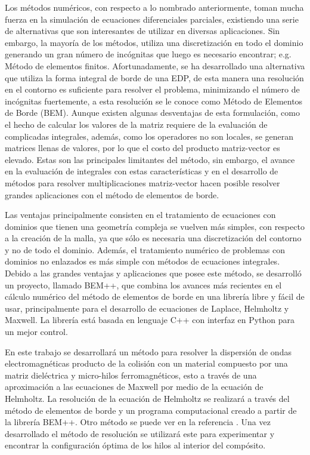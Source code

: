 \documentclass[12pt,letterpaper]{article}
\numberwithin{equation}{section}
\begin{document}
Los métodos numéricos, con respecto a lo nombrado anteriormente, toman mucha fuerza en la simulación de ecuaciones diferenciales parciales, existiendo una serie de alternativas que son interesantes de utilizar en diversas aplicaciones. Sin embargo, la mayoría de los métodos, utiliza una discretización en todo el dominio generando un gran número de incógnitas que
luego es necesario encontrar; e.g. Método de elementos finitos. Afortunadamente, se ha desarrollado una alternativa que utiliza la forma integral de borde de una EDP, de esta manera una resolución en el contorno es suficiente para resolver el problema, minimizando el número de incógnitas fuertemente, a esta resolución se le conoce como Método de Elementos de Borde
(BEM). Aunque existen algunas desventajas de esta formulación, como el hecho de calcular los valores de la matriz requiere de la evaluación de complicadas integrales, además, como los operadores no son locales, se generan matrices llenas de valores, por lo que el costo del producto matriz-vector es elevado. Estas son las principales limitantes del método, sin embargo, el avance en la evaluación de integrales con estas características y en el desarrollo de métodos para resolver multiplicaciones matriz-vector hacen posible resolver grandes aplicaciones con el método de elementos de borde. 

Las ventajas principalmente consisten en el tratamiento de ecuaciones con dominios que tienen una geometría compleja se vuelven más simples, con respecto a la creación de la malla, ya que sólo es necesaria una
discretización del contorno y no de todo el dominio. Además, el tratamiento numérico de problemas con dominios no enlazados es más simple con
métodos de ecuaciones integrales. Debido a las grandes ventajas y aplicaciones que posee este método, se desarrolló un proyecto, llamado BEM++, que combina los avances más recientes en el cálculo numérico del método de elementos de borde en una librería libre y fácil de usar, principalmente para el desarrollo de ecuaciones de Laplace, Helmholtz y Maxwell. La librería está basada en lenguaje C++ con interfaz en Python para un mejor control.

En este trabajo se desarrollará un método para resolver la dispersión de ondas electromagnéticas producto de la colisión con un material compuesto por una matriz dieléctrica y micro-hilos ferromagnéticos, esto a través de una aproximación a las ecuaciones de Maxwell por medio de la ecuación de Helmholtz. La resolución de la ecuación de Helmholtz se realizará a través del método de elementos de borde y un programa computacional creado a partir de la librería BEM++. Otro método se puede ver en la referencia \cite{Wire_theory_2}. Una vez desarrollado el método de resolución se utilizará este para experimentar y encontrar la configuración óptima de los hilos al interior del compósito. 
\end{document}
